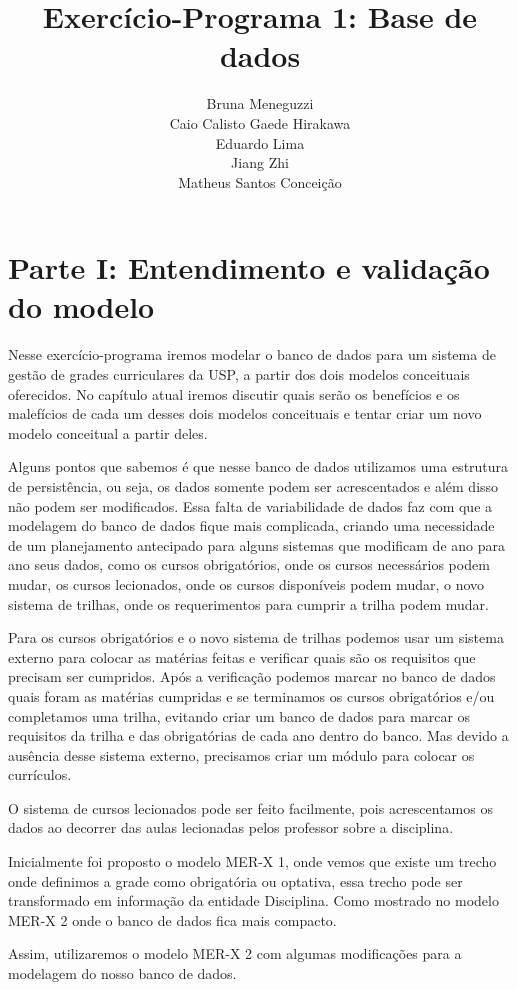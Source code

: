 \documentclass{report}
\author{Bruna Meneguzzi \\ Caio Calisto Gaede Hirakawa \\ Eduardo Lima \\ Jiang Zhi \\ Matheus Santos Conceição}
\title{Exercício-Programa 1: Base de dados}
\begin{document}
\maketitle
\tableofcontents
\chapter{Parte I: Entendimento e validação do modelo}
Nesse exercício-programa iremos modelar o banco de dados para um sistema de gestão de grades curriculares da USP, a partir dos dois modelos conceituais oferecidos. No capítulo atual iremos discutir quais serão os benefícios e os malefícios de cada um desses dois modelos conceituais e tentar criar um novo modelo conceitual a partir deles.

Alguns pontos que sabemos é que nesse banco de dados utilizamos uma estrutura de persistência, ou seja, os dados somente podem ser acrescentados e além disso não podem ser modificados. Essa falta de variabilidade de dados faz com que a modelagem do banco de dados fique mais complicada, criando uma necessidade de um planejamento antecipado para alguns sistemas que modificam de ano para ano seus dados, como os cursos obrigatórios, onde os cursos necessários podem mudar, os cursos lecionados, onde os cursos disponíveis podem mudar, o novo sistema de trilhas, onde os requerimentos para cumprir a trilha podem mudar.

Para os cursos obrigatórios e o novo sistema de trilhas podemos usar um sistema externo para colocar as matérias feitas e verificar quais são os requisitos que precisam ser cumpridos. Após a verificação podemos marcar no banco de dados quais foram as matérias cumpridas e se terminamos os cursos obrigatórios e/ou completamos uma trilha, evitando criar um banco de dados para marcar os requisitos da trilha e das obrigatórias de cada ano dentro do banco. Mas devido a ausência desse sistema externo, precisamos criar um módulo para colocar os currículos.

O sistema de cursos lecionados pode ser feito facilmente, pois acrescentamos os dados ao decorrer das aulas lecionadas pelos  professor sobre a disciplina.

Inicialmente foi proposto o modelo MER-X 1, onde vemos que existe um trecho onde definimos a grade como obrigatória ou optativa, essa trecho pode ser transformado em informação da entidade Disciplina. Como mostrado no modelo MER-X 2 onde o banco de dados fica mais compacto.

Assim, utilizaremos o modelo MER-X 2 com algumas modificações para a modelagem do nosso banco de dados.
\end{document}

